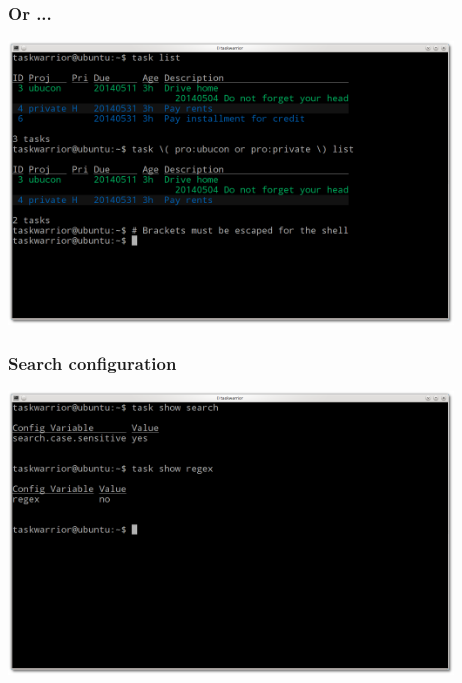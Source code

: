 \documentclass[t,handout]{beamer}
\begin{document}
\begin{frame}[fragile]\frametitle{Or ...}
\begin{center} %
\includegraphics[width=11.8cm,height=7.5cm]{or.png}
\end{center}
\end{frame}

\begin{frame}[fragile]\frametitle{Search configuration}
\begin{center} %
\includegraphics[width=11.8cm,height=7.5cm]{search-configuration.png}
\end{center}
\end{frame}
\end{document}
